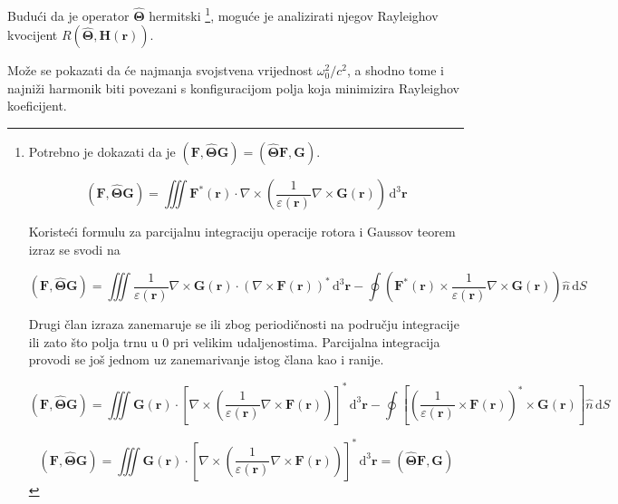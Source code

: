 \documentclass[utf8, seminar]{fer}
\begin{document}
Budući da je operator $\hat{\mathbf{\Theta}}$ hermitski
\footnote{
	Potrebno je dokazati da je ${(\mathbf{F}, \hat{\mathbf{\Theta}}\mathbf{G})
	=(\hat{\mathbf{\Theta}} \mathbf{F}, \mathbf{G})}$.

	$$(\mathbf{F}, \hat{\mathbf{\Theta}}\mathbf{G}) =
	\iiint \mathbf{F}^* (\mathbf{r}) \cdot \nabla \times \left(
		\frac{1}{\varepsilon (\mathbf{r})} \nabla \times \mathbf{G}(\mathbf{r})
	\right) \, \mathrm{d}^3 \mathbf{r}$$

	Koristeći formulu za parcijalnu integraciju operacije rotora i Gaussov
	teorem izraz se svodi na


	$$(\mathbf{F}, \hat{\mathbf{\Theta}}\mathbf{G}) =
	\iiint \frac{1}{\varepsilon (\mathbf{r})} \nabla \times \mathbf{G}(\mathbf{r})
	\cdot \left(
		\nabla \times \mathbf{F}(\mathbf{r})
	\right)^* \, \mathrm{d}^3 \mathbf{r}
	- \oint \left(
		\mathbf{F}^*(\mathbf{r}) \times \frac{1}{\varepsilon(\mathbf{r})}
		\nabla \times \mathbf{G}(\mathbf{r})
	\right) \hat{n} \, \mathrm{d}S$$

	Drugi član izraza zanemaruje se ili zbog periodičnosti na području integracije
	ili zato što polja trnu u 0 pri velikim udaljenostima. Parcijalna integracija
	provodi se još jednom uz zanemarivanje istog člana kao i ranije.

	$$(\mathbf{F}, \hat{\mathbf{\Theta}}\mathbf{G}) =
	\iiint \mathbf{G}(\mathbf{r})
	\cdot \left[
		\nabla \times \left(
			\frac{1}{\varepsilon (\mathbf{r})} \nabla \times
			\mathbf{F}(\mathbf{r})
		\right)
	\right]^* \, \mathrm{d}^3 \mathbf{r}
	- \oint \left[
		\left(
			\frac{1}{\varepsilon(\mathbf{r})} \times \mathbf{F}(\mathbf{r})
		\right)^*
		\times \mathbf{G}(\mathbf{r})
	\right] \hat{n} \, \mathrm{d}S$$

	$$(\mathbf{F}, \hat{\mathbf{\Theta}}\mathbf{G}) =
	\iiint \mathbf{G}(\mathbf{r})
	\cdot \left[
		\nabla \times \left(
			\frac{1}{\varepsilon (\mathbf{r})} \nabla \times
			\mathbf{F}(\mathbf{r})
		\right)
	\right]^* \, \mathrm{d}^3 \mathbf{r}
	= (\hat{\mathbf{\Theta}} \mathbf{F}, \mathbf{G})$$
},
moguće je analizirati njegov Rayleighov kvocijent
$R \left(\hat{\mathbf{\Theta}}, \mathbf{H}(\mathbf{r}) \right)$.

Može se pokazati da će najmanja svojstvena vrijednost $\omega_0^2/c^2$, a
shodno tome i najniži harmonik biti povezani s konfiguracijom polja koja
minimizira Rayleighov koeficijent.
\end{document}
